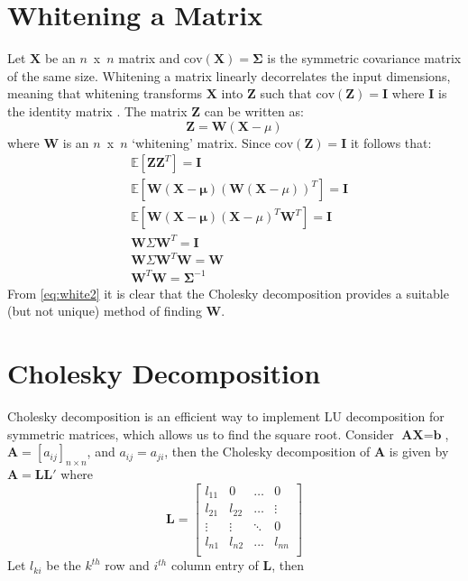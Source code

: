 \section{Whitening a Matrix}\label{a:whitening}
Let $\textbf{X}$ be an $n$~x~$n$ matrix and $\mbox{cov}(\textbf{X}) = \mathbf{\Sigma}$ is the symmetric covariance matrix of the same size.
Whitening a matrix linearly decorrelates the input dimensions, meaning that whitening transforms $\textbf{X}$ into $\textbf{Z}$ such that $\mbox{cov}(\textbf{Z}) = \textbf{I}$ where $\textbf{I}$ is the identity matrix \cite{kessy2017optimal}. 
The matrix $\textbf{Z}$ can be written as:
\begin{equation}
\textbf{Z} = \textbf{W}(\textbf{X} - \mu)
\label{eq:white1}
\end{equation}
where $\textbf{W}$ is an $n$~x~$n$ `whitening' matrix. Since $\mbox{cov}(\textbf{Z}) = \textbf{I}$ it follows that:
\begin{align}
&\mathbb{E}[\mathbf{Z}\mathbf{Z}^T] = \mathbf{I} \nonumber \\
&\mathbb{E}[\mathbf{W}(\mathbf{X - \mu})(\mathbf{W}(\mathbf{X} - \mu))^T] = \mathbf{I} \nonumber \\
&\mathbb{E}[\mathbf{W}(\mathbf{X - \mu})(\mathbf{X} - \mu)^T\mathbf{W}^T] = \mathbf{I} \nonumber \\
&\mathbf{W}\Sigma\mathbf{W}^T = \mathbf{I} \nonumber \\
&\mathbf{W}\Sigma\mathbf{W}^T\mathbf{W} = \mathbf{W} \nonumber \\
&\mathbf{W}^T \mathbf{W} = \mathbf{\Sigma}^{-1} \label{eq:white2}
\end{align}
From \eqref{eq:white2} it is clear that the Cholesky decomposition provides a suitable (but not unique) method of finding $\textbf{W}$.

\section{Cholesky Decomposition}
Cholesky decomposition is an efficient way to implement LU decomposition for symmetric matrices, which allows us to find the square root.
Consider $\textbf{A}\textbf{X} = \textbf{b}$, $\textbf{A}=[a_{ij}]_{n\times n}$, and $a_{ij} = a_{ji}$, then the Cholesky decomposition of $\textbf{A}$ is given by $\textbf{A} = \textbf{L}\textbf{L}'$ where
\begin{equation}
\textbf{L}=
\begin{bmatrix}
 l_{11} & 0 & \ldots & 0 \\
 l_{21} & l_{22} & \ldots & \vdots \\
 \vdots & \vdots & \ddots & 0 \\
 l_{n1} & l_{n2} & ... & l_{nn} \\
\end{bmatrix}
\label{eq:cholesky1}
\end{equation}
Let $l_{ki}$ be the $k^{th}$ row and $i^{th}$ column entry of $\textbf{L}$, then

